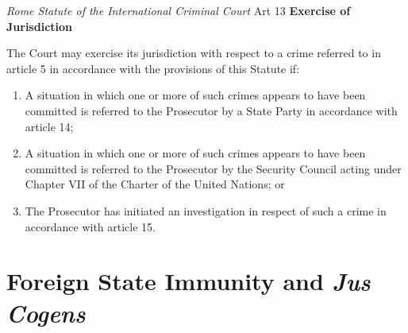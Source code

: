 \begin{statutedetails}{\textit{Rome Statute of the International Criminal Court} Art 13}
    \flushleft
    \textbf{Exercise of Jurisdiction}

    \vspace{\baselineskip}

    The Court may exercise its jurisdiction with respect to a crime referred to in article 5 in  accordance with the provisions of this Statute if: 
    \begin{enumerate}[label=(\alph*)]
        \item A situation in which one or more of such crimes appears to have been committed is referred to the Prosecutor by a State Party in accordance with article 14; 
        \item A situation in which one or more of such crimes appears to have been committed is referred to the Prosecutor by the Security Council acting under Chapter VII of the Charter of the United Nations; or 
        \item The Prosecutor has initiated an investigation in respect of such a crime in accordance with article 15.
    \end{enumerate}
\end{statutedetails}

\section{Foreign State Immunity and \textit{Jus Cogens}}

